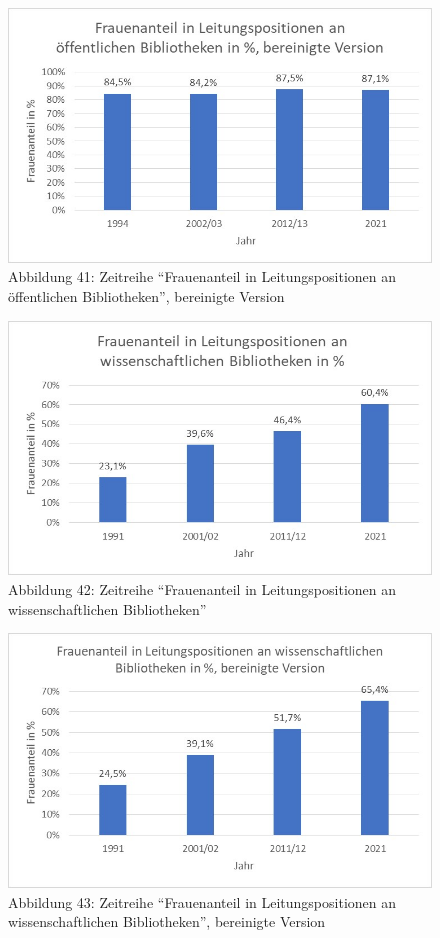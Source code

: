 \documentclass[a4paper,
fontsize=11pt,
oneside,
numbers=noperiodatend,
parskip=half-,
bibliography=totoc,
final
]{scrartcl}
\begin{document}
\begin{figure}
\centering
\includegraphics{img/Abb_41_Zeitreihe-OB_bereinigt.jpg}
\caption{Abbildung 41: Zeitreihe \enquote{Frauenanteil in
Leitungspositionen an öffentlichen Bibliotheken}, bereinigte Version}
\end{figure}

\begin{figure}
\centering
\includegraphics{img/Abb_42_Zeitreihe-WB.jpg}
\caption{Abbildung 42: Zeitreihe \enquote{Frauenanteil in
Leitungspositionen an wissenschaftlichen Bibliotheken}}
\end{figure}

\begin{figure}
\centering
\includegraphics{img/Abb_43_Zeitreihe-WB_bereinigt.jpg}
\caption{Abbildung 43: Zeitreihe \enquote{Frauenanteil in
Leitungspositionen an wissenschaftlichen Bibliotheken}, bereinigte
Version}
\end{figure}
\end{document}
